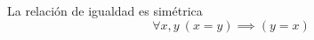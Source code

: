 \begin{theorem} \label{eq_symm} La relación de igualdad es simétrica
	\begin{equation}
		\forall x,y\ (x=y) \implies (y=x)
	\end{equation}
\end{theorem}
